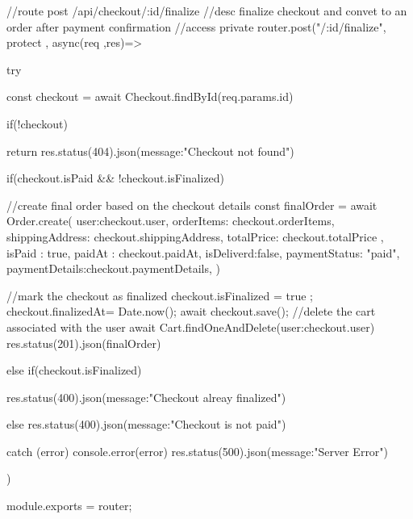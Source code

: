 //route post /api/checkout/:id/finalize
//desc finalize checkout and convet to an order after payment confirmation
//access private 
router.post("/:id/finalize", protect , async(req ,res)=>{
    try {
        const checkout = await Checkout.findById(req.params.id)
    


        if(!checkout){
            return res.status(404).json({message:"Checkout not found"})

        }
        if(checkout.isPaid && !checkout.isFinalized){
            //create final order based on the checkout details 
            const finalOrder = await Order.create({
                user:checkout.user,
                orderItems: checkout.orderItems,
                shippingAddress: checkout.shippingAddress,
                totalPrice: checkout.totalPrice ,
                isPaid : true,
                paidAt : checkout.paidAt,
                isDeliverd:false,
                paymentStatus: "paid",
                paymentDetails:checkout.paymentDetails,
            })


//mark the checkout as finalized
checkout.isFinalized = true ;
checkout.finalizedAt= Date.now();
await checkout.save();
//delete the cart associated with the user 
await Cart.findOneAndDelete({user:checkout.user})
res.status(201).json(finalOrder)



        }else if(checkout.isFinalized){
            res.status(400).json({message:"Checkout alreay finalized"})

        }else{
            res.status(400).json({message:"Checkout is not paid"})
        }
    } catch (error) {
        console.error(error)
        res.status(500).json({message:"Server Error"})
    }
})






module.exports = router;

